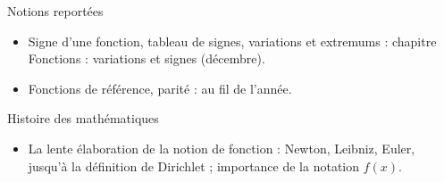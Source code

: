 \documentclass{article}
\theoremstyle{definition}
\begin{document}
\begin{paragraph}{Notions reportées}
    \begin{itemize}
        \item Signe d'une fonction, tableau de signes, variations et extremums : chapitre \og Fonctions : variations et signes \fg{} (décembre).
        \item Fonctions de référence, parité : au fil de l'année.
    \end{itemize}
\end{paragraph}

\begin{paragraph}{Histoire des mathématiques}
    \begin{itemize}
        \item La lente élaboration de la notion de fonction : Newton, Leibniz, Euler, jusqu'à la définition de Dirichlet ; importance de la notation $f(x)$.
    \end{itemize}
\end{paragraph}
\end{document}
